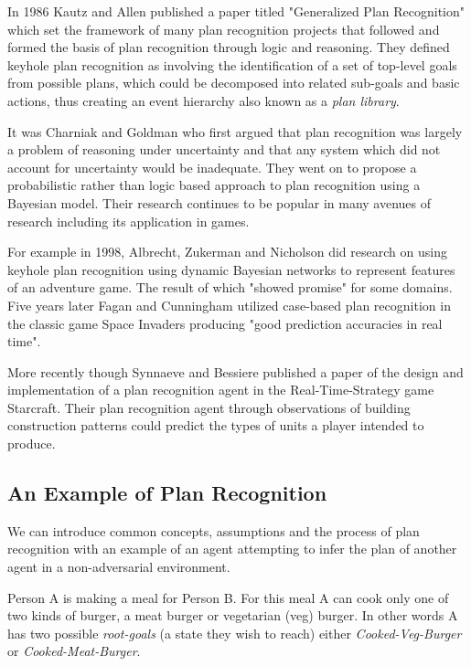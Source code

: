 \documentclass[parskip]{cs4rep}
\begin{document}
In 1986 Kautz and Allen published a paper titled "Generalized Plan Recognition" \cite{conf/aaai/KautzA86} which set the framework of many plan recognition projects that followed and formed the basis of plan recognition through logic and reasoning. They defined keyhole plan recognition as involving the identification of a set of top-level goals from possible plans, which could be decomposed into related sub-goals and basic actions, thus creating an event hierarchy also known as a \textit{plan library}. 

It was Charniak and Goldman \cite{journals/ai/CharniakG93} who first argued that plan recognition was largely a problem of reasoning under uncertainty and that any system which did not account for uncertainty would be inadequate. They went on to propose a probabilistic rather than logic based approach to plan recognition using a Bayesian model. Their research continues to be popular in many avenues of research including its application in games.

For example in 1998, Albrecht, Zukerman and Nicholson \cite{Albrecht:1998:BMK:598277.598308} did research on using keyhole plan recognition using dynamic Bayesian networks to represent features of an adventure game. The result of which "showed promise" for some domains. Five years later Fagan and Cunningham utilized case-based plan recognition in the classic game Space Invaders \cite{Fagan03case-basedplan} producing "good prediction accuracies in real time".

More recently though Synnaeve and Bessiere \cite{conf/aiide/SynnaeveB11} published a paper of the design and implementation of a plan recognition agent in the Real-Time-Strategy game Starcraft. Their plan recognition agent through observations of building construction patterns could predict the types of units a player intended to produce.

\subsection{An Example of Plan Recognition}

We can introduce common concepts, assumptions and the process of plan recognition with an example of an agent attempting to infer the plan of another agent in a non-adversarial environment. 

Person A is making a meal for Person B. For this meal A can cook only one of two kinds of burger, a meat burger or vegetarian (veg) burger. In other words A has two possible \textit{root-goals} (a state they wish to reach) either \textit{Cooked-Veg-Burger} or \textit{Cooked-Meat-Burger}. 
\end{document}
